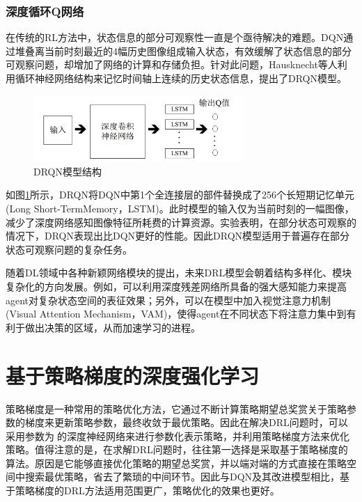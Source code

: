 \documentclass[bachelor]{thesis-uestc}
\begin{document}
	\subsubsection{深度循环Q网络}
	在传统的RL方法中，状态信息的部分可观察性一直是个亟待解决的难题。DQN通过堆叠离当前时刻最近的4幅历史图像组成输入状态，有效缓解了状态信息的部分可观察问题，却增加了网络的计算和存储负担。针对此问题，Hausknecht等人\cite{hausknecht2015deep}利用循环神经网络结构来记忆时间轴上连续的历史状态信息，提出了DRQN模型。
	\begin{figure}
		\includegraphics[width=8cm]{./pic/fg4.jpg}
		\caption{DRQN模型结构}
		\label{fg4}
	\end{figure}
	如图\ref{fg4}所示，DRQN将DQN中第1个全连接层的部件替换成了256个长短期记忆单元(Long Short-TermMemory，LSTM)。此时模型的输入仅为当前时刻的一幅图像，减少了深度网络感知图像特征所耗费的计算资源。实验表明，在部分状态可观察的情况下，DRQN表现出比DQN更好的性能。因此DRQN模型适用于普遍存在部分状态可观察问题的复杂任务。
	
	随着DL领域中各种新颖网络模块的提出，未来DRL模型会朝着结构多样化、模块复杂化的方向发展。例如，可以利用深度残差网络所具备的强大感知能力来提高agent对复杂状态空间的表征效果；另外，可以在模型中加入视觉注意力机制(Visual Attention Mechanism，VAM)，使得agent在不同状态下将注意力集中到有利于做出决策的区域，从而加速学习的进程。
	
	\section{基于策略梯度的深度强化学习}
	策略梯度是一种常用的策略优化方法，它通过不断计算策略期望总奖赏关于策略参数的梯度来更新策略参数，最终收敛于最优策略。因此在解决DRL问题时，可以采用参数为的深度神经网络来进行参数化表示策略，并利用策略梯度方法来优化策略。值得注意的是，在求解DRL问题时，往往第一选择是采取基于策略梯度的算法。原因是它能够直接优化策略的期望总奖赏，并以端对端的方式直接在策略空间中搜索最优策略，省去了繁琐的中间环节。因此与DQN及其改进模型相比，基于策略梯度的DRL方法适用范围更广，策略优化的效果也更好。
\end{document}
